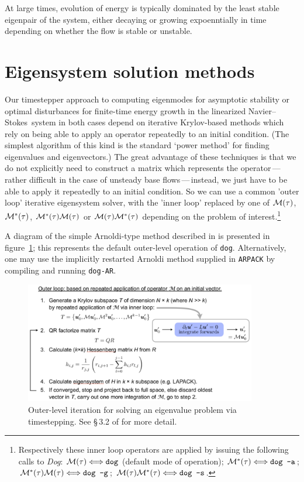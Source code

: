 \documentclass[11pt,a4paper]{report}
\newcommand\NavSto{Navier--Stokes}
\newcommand\LNS{linearized \NavSto}
\newcommand\Mop{{\cal M}}
\newcommand\Madj{{\cal M^*}}
\newcommand{\Dog}{\emph{Dog}}
\begin{document}
At large times, evolution of energy is typically dominated by the
least stable eigenpair of the system, either decaying or growing
expoenntially in time depending on whether the flow is stable or
unstable.

\section{Eigensystem solution methods}
\label{sec.outer}

Our timestepper approach to computing eigenmodes for asymptotic
stability or optimal disturbances for finite-time energy growth in the
\LNS\ system in both cases depend on iterative Krylov-based methods
which rely on being able to apply an operator repeatedly to an initial
condition. (The simplest algorithm of this kind is the standard `power
method' for finding eigenvalues and eigenvectors.)  The great
advantage of these techniques is that we do not explicitly need to
construct a matrix which represents the operator\,---\,rather
difficult in the case of unsteady base flows\,---\,instead, we just
have to be able to apply it repeatedly to an initial condition.  So we
can use a common 'outer loop' iterative eigensystem solver, with the
'inner loop' replaced by one of $\Mop(\tau)$, $\Madj(\tau)$,
$\Madj(\tau)\Mop(\tau)$ or $\Mop(\tau)\Madj(\tau)$ depending on the
problem of interest.\footnote{Respectively these inner loop operators
  are applied by issuing the following calls to \Dog:
  $\Mop(\tau)\Longleftrightarrow\texttt{dog}$ (default mode of
  operation); $\Madj(\tau)\Longleftrightarrow\texttt{dog~-a}$;
  $\Madj(\tau)\Mop(\tau)\Longleftrightarrow\texttt{dog~-g}$;
  $\Mop(\tau)\Madj(\tau)\Longleftrightarrow\texttt{dog~-s}$.}

A diagram of the simple Arnoldi-type method described in
\citet{bbs08b} is presented in figure~\ref{fig.DBA}; this represents
the default outer-level operation of \verb+dog+.  Alternatively, one
may use the implicitly restarted Arnoldi method supplied in
\verb+ARPACK+ \citep{lehoucq98} by compiling and running \verb+dog-AR+.

\begin{figure}
\begin{center}
\includegraphics[width=0.9\textwidth]{DBAlgorithm}
\end{center}
\caption{Outer-level iteration for solving an eigenvalue problem via
  timestepping. See \S\,3.2 of \citet{bbs08b} for more detail.}
\label{fig.DBA}
\end{figure}
\end{document}
